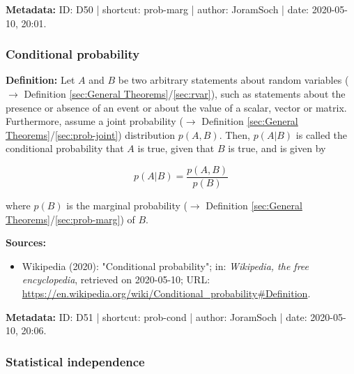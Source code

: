 \documentclass[a4paper,12pt,twoside]{book}
\begin{document}
\vspace{1em}
\textbf{Metadata:} ID: D50 | shortcut: prob-marg | author: JoramSoch | date: 2020-05-10, 20:01.
\vspace{1em}



\subsubsection[\textit{Conditional probability}]{Conditional probability} \label{sec:prob-cond}
\setcounter{equation}{0}

\textbf{Definition:} Let $A$ and $B$ be two arbitrary statements about random variables ($\rightarrow$ Definition \ref{sec:General Theorems}/\ref{sec:rvar}), such as statements about the presence or absence of an event or about the value of a scalar, vector or matrix. Furthermore, assume a joint probability ($\rightarrow$ Definition \ref{sec:General Theorems}/\ref{sec:prob-joint}) distribution $p(A,B)$. Then, $p(A \vert B)$ is called the conditional probability that $A$ is true, given that $B$ is true, and is given by

\begin{equation} \label{eq:prob-cond-prob-cond}
p(A|B) = \frac{p(A,B)}{p(B)}
\end{equation}

where $p(B)$ is the marginal probability ($\rightarrow$ Definition \ref{sec:General Theorems}/\ref{sec:prob-marg}) of $B$.


\vspace{1em}
\textbf{Sources:}
\begin{itemize}
\item Wikipedia (2020): "Conditional probability"; in: \textit{Wikipedia, the free encyclopedia}, retrieved on 2020-05-10; URL: \url{https://en.wikipedia.org/wiki/Conditional_probability#Definition}.
\end{itemize}


\vspace{1em}
\textbf{Metadata:} ID: D51 | shortcut: prob-cond | author: JoramSoch | date: 2020-05-10, 20:06.
\vspace{1em}



\subsubsection[\textit{Statistical independence}]{Statistical independence} \label{sec:ind}
\setcounter{equation}{0}
\end{document}

